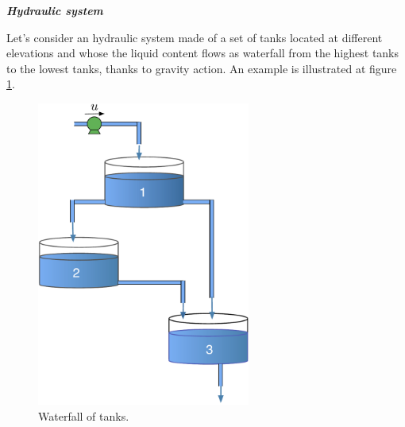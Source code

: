 \begin{exemple}\label{systhyd}{\bf \em Hydraulic system}

Let's consider an hydraulic system made of a set of 
tanks located at different elevations and whose the liquid content  
flows \og as waterfall \gf from the highest tanks to the lowest tanks, 
thanks to gravity action. An example is illustrated at figure \ref{Fig:cascade}.

\begin{figure}[h] 
\begin{center}
\includegraphics[width=7cm]{images/cascade}
\caption{Waterfall of tanks.}
\label{Fig:cascade}
\end{center} 
\end{figure}


\end{exemple}
